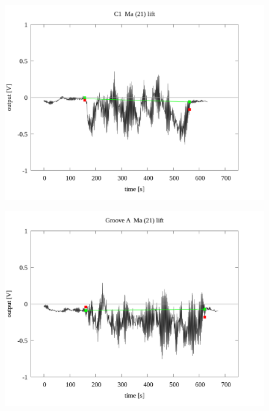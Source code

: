 \documentclass[a4paper]{jsarticle}
\begin{document}
\begin{figure}[htbp]
    \footnotesize
    \begin{center}
        \includegraphics[width=140mm]{../../../../33_result/210806/moving_average/21/lift/03/C1_ma(21)_lift_03.png}
    \end{center}
\end{figure}

\begin{figure}[htbp]
    \footnotesize
    \begin{center}
        \includegraphics[width=140mm]{../../../../33_result/210806/moving_average/21/lift/03/Groove_A_ma(21)_lift_03.png}
    \end{center}
\end{figure}
\end{document}
